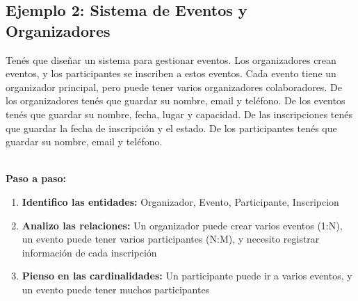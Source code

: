 \documentclass[12pt]{article}
\begin{document}
\subsection{Ejemplo 2: Sistema de Eventos y Organizadores}
Tenés que diseñar un sistema para gestionar eventos. Los organizadores crean eventos, y los participantes se inscriben a estos eventos. Cada evento tiene un organizador principal, pero puede tener varios organizadores colaboradores. De los organizadores tenés que guardar su nombre, email y teléfono. De los eventos tenés que guardar su nombre, fecha, lugar y capacidad. De las inscripciones tenés que guardar la fecha de inscripción y el estado. De los participantes tenés que guardar su nombre, email y teléfono.

\textbf{\\Paso a paso:}
\begin{enumerate}
    \item \textbf{Identifico las entidades:} Organizador, Evento, Participante, Inscripcion
    \item \textbf{Analizo las relaciones:} Un organizador puede crear varios eventos (1:N), un evento puede tener varios participantes (N:M), y necesito registrar información de cada inscripción
    \item \textbf{Pienso en las cardinalidades:} Un participante puede ir a varios eventos, y un evento puede tener muchos participantes
\end{enumerate}
\end{document}

